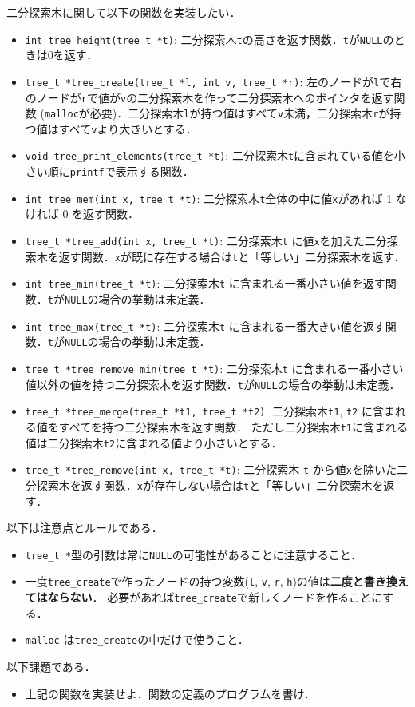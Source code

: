 \documentclass[a4paper,twoside,onecolumn,openany,article]{memoir}
\theoremstyle{remark}
\begin{document}
二分探索木に関して以下の関数を実装したい．
\begin{itemize}
\item \texttt{int tree\_height(tree\_t *t)}: 二分探索木\texttt{t}の高さを返す関数．\texttt{t}が\texttt{NULL}のときは0を返す．
\item \texttt{tree\_t *tree\_create(tree\_t *l, int v, tree\_t *r)}: 左のノードが\texttt{l}で右のノードが\texttt{r}で値が\texttt{v}の二分探索木を作って二分探索木へのポインタを返す関数
(\texttt{malloc}が必要)．二分探索木\texttt{l}が持つ値はすべて\texttt{v}未満，二分探索木\texttt{r}が持つ値はすべて\texttt{v}より大きいとする．
\item \texttt{void tree\_print\_elements(tree\_t *t)}: 二分探索木\texttt{t}に含まれている値を小さい順に\texttt{printf}で表示する関数．
\item \texttt{int tree\_mem(int x, tree\_t *t)}: 二分探索木\texttt{t}全体の中に値\texttt{x}があれば 1 なければ 0 を返す関数．
\item \texttt{tree\_t *tree\_add(int x, tree\_t *t)}: 二分探索木\texttt{t} に値\texttt{x}を加えた二分探索木を返す関数．\texttt{x}が既に存在する場合は\texttt{t}と「等しい」二分探索木を返す．
\item \texttt{int tree\_min(tree\_t *t)}: 二分探索木\texttt{t} に含まれる一番小さい値を返す関数．\texttt{t}が\texttt{NULL}の場合の挙動は未定義．
\item \texttt{int tree\_max(tree\_t *t)}: 二分探索木\texttt{t} に含まれる一番大きい値を返す関数．\texttt{t}が\texttt{NULL}の場合の挙動は未定義．
\item \texttt{tree\_t *tree\_remove\_min(tree\_t *t)}: 二分探索木\texttt{t} に含まれる一番小さい値以外の値を持つ二分探索木を返す関数．\texttt{t}が\texttt{NULL}の場合の挙動は未定義．
\item \texttt{tree\_t *tree\_merge(tree\_t *t1, tree\_t *t2)}: 二分探索木\texttt{t1}, \texttt{t2} に含まれる値をすべてを持つ二分探索木を返す関数．
ただし二分探索木\texttt{t1}に含まれる値は二分探索木\texttt{t2}に含まれる値より小さいとする．
\item \texttt{tree\_t *tree\_remove(int x, tree\_t *t)}: 二分探索木 \texttt{t} から値\texttt{x}を除いた二分探索木を返す関数．\texttt{x}が存在しない場合は\texttt{t}と「等しい」二分探索木を返す．
\end{itemize}
以下は注意点とルールである．
\begin{itemize}
\item \texttt{tree\_t *}型の引数は常に\texttt{NULL}の可能性があることに注意すること．
\item 一度\texttt{tree\_create}で作ったノードの持つ変数(\texttt{l}, \texttt{v}, \texttt{r}, \texttt{h})の値は\textbf{二度と書き換えてはならない}．
必要があれば\texttt{tree\_create}で新しくノードを作ることにする．
\item \texttt{malloc} は\texttt{tree\_create}の中だけで使うこと．
\end{itemize}
以下課題である．
\begin{itemize}
\item 上記の関数を実装せよ．関数の定義のプログラムを書け．
\end{itemize}
\end{document}
